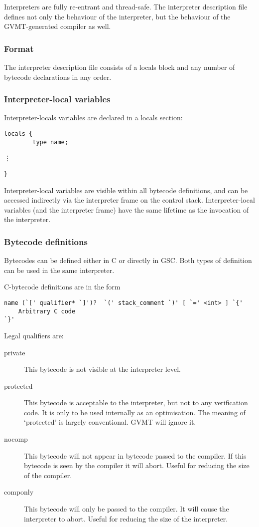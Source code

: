 Interpreters are fully re-entrant and thread-safe. The interpreter description file  defines not only the behaviour of the interpreter, but the behaviour of the GVMT-generated compiler as well.

\subsubsection{Format}

The interpreter description file consists of a locals block and any number of bytecode declarations in any order. 
\subsubsection{Interpreter-local variables}
Interpreter-locals variables are declared in a locals section:
\begin{verbatim}
locals {
        type name;
\end{verbatim}
\nopagebreak
        \vdots
\begin{verbatim}
}
\end{verbatim}

Interpreter-local variables are visible within all bytecode definitions, and can be accessed indirectly via the interpreter frame on the control stack. Interpreter-local variables (and the interpreter frame) have the same lifetime as the invocation of the interpreter.

\subsubsection{Bytecode definitions}
Bytecodes can be defined either in C or directly in GSC. Both types of definition can be used in the same interpreter.

C-bytecode definitions are in the form

\begin{verbatim}
name (`[' qualifier* `]')?  `(' stack_comment `)' [ `=' <int> ] `{'
    Arbitrary C code
`}'
\end{verbatim}

Legal qualifiers are:
\begin{description}
\item [private] This bytecode is not visible at the interpreter level.
\item [protected] This bytecode is acceptable to the interpreter, but not to any verification code. It is only to be used internally as an optimisation. The meaning of `protected' is largely conventional. GVMT will ignore it.
\item [nocomp] This bytecode will not appear in bytecode passed to the compiler. If this bytecode is seen by the compiler it will abort.
Useful for reducing the size of the compiler.
\item [componly] This bytecode will only be passed to the compiler. It will cause the interpreter to abort. Useful for reducing the size of the interpreter.
\end{description}

